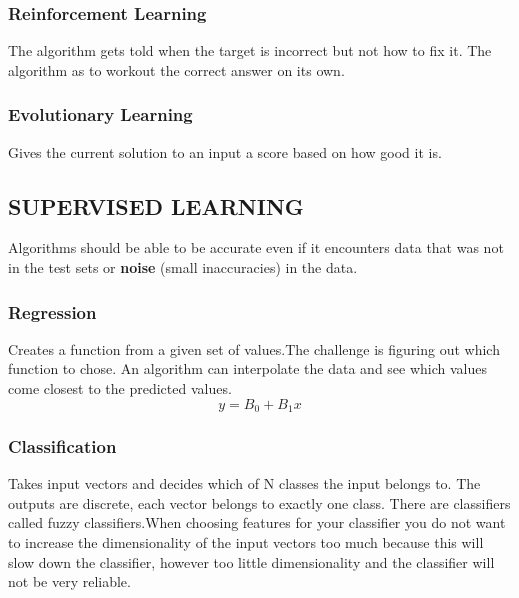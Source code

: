 \documentclass[english]{def}
\begin{document}
\subsubsection{Reinforcement Learning} The algorithm gets told when the target is incorrect but not how to fix it. The algorithm as to workout the correct answer on its own. 
\subsubsection{Evolutionary Learning} Gives the current solution to an input a score based on how good it is. 

\subsection{SUPERVISED LEARNING}
Algorithms should be able to be accurate even if it encounters data that was not in the test sets or \textbf{noise} (small inaccuracies) in the data. 

\subsubsection{Regression}
Creates a function from a given set of values.The challenge is figuring out which function to chose. An algorithm can interpolate the data and see which values come closest to the predicted values.
\[y = B_0 + B_1x\]

\subsubsection{Classification}
Takes input vectors and decides which of N classes the input belongs to. The outputs are discrete, each vector belongs to exactly one class. There are classifiers called fuzzy classifiers.When choosing features for your classifier you do not want to increase the dimensionality of the input vectors too much because this will slow down the classifier, however too little dimensionality and the classifier will not be very reliable. 


\end{document}
